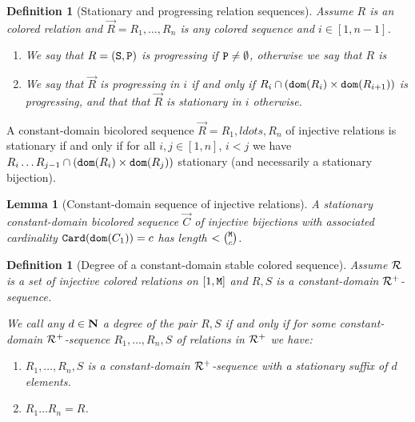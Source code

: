 \documentclass{lmcs}
\newtheorem{lemma}[theorem]{Lemma}
\newtheorem{definition}[theorem]{Definition}
\begin{document}
\begin{definition}[Stationary and progressing relation sequences]
Assume $R$ is an colored relation and $\vec{R}=R_1, \ldots, R_n$ is any colored sequence 
and $i \in [1,n-1]$.
\begin{enumerate}

\item
We say that $R=({\tt S},{\tt P})$ is progressing if ${\tt P} \not = \emptyset$, otherwise we say
that $R$ is 

\item
We say that $\vec{R}$ is progressing in $i$ if and only if 
$R_i \cap ({\tt dom}(R_i) \times {\tt dom}(R_{i+1}))$ is progressing,
and that that $\vec{R}$ is stationary in $i$ otherwise.
\end{enumerate}
\end{definition}

A constant-domain bicolored sequence $\vec{R}=R_1, ldots, R_n$
of injective relations is stationary if and only if for all $i,j \in [1,n]$, $i < j$ we have
$R_i \ldots R_{j-1} \cap ({\tt dom}(R_i) \times {\tt dom}(R_j))$ stationary (and necessarily
a stationary bijection).

\begin{lemma}[Constant-domain sequence of injective relations]
\label{lemma-constant-injective}
A stationary constant-domain bicolored sequence $\vec{C}$ of injective bijections 
with associated cardinality ${\tt Card}({\tt dom}(C_1))=c$ has length $< \newton{\MaxInd}{c}$.
\end{lemma}


\begin{definition}[Degree of a constant-domain stable colored sequence]
Assume ${\mathcal R}$ is a set of injective colored relations on $[1,{\tt M}]$ and
$R,S$ is a constant-domain ${\mathcal R}^+$-sequence. 

We call any $d \in {\bf N}$ a degree of the pair $R,S$ 
if and only if for some constant-domain ${\mathcal R}^+$-sequence 
$R_1, \ldots, R_n, S$ of relations in ${\mathcal R}^+$ we have:

\begin{enumerate}

\item
$R_1, \ldots, R_n, S$ is a constant-domain ${\mathcal R}^+$-sequence with
a \emph{stationary} suffix of $d$ elements. 

\item
$R_1 \ldots R_n = R$.

\end{enumerate}
\end{definition}
\end{document}
